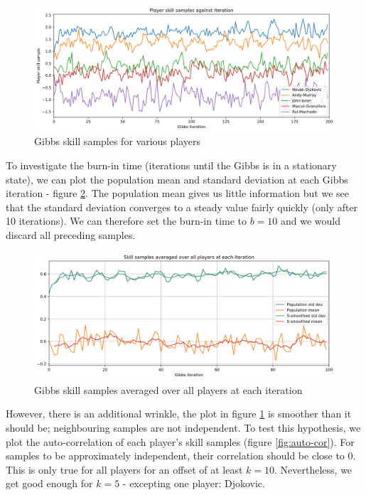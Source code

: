 \documentclass[]{article}
\begin{document}
\begin{figure}[!h]
	\centering
	\includegraphics[width=\linewidth]{skill-samples-long.png}
	\caption{Gibbs skill samples for various players}
	\label{fig:skill-samples-long}
\end{figure}

To investigate the burn-in time (iterations until the Gibbs is in a stationary state), we can plot the population mean and standard deviation at each Gibbs iteration - figure \ref{fig:burn-in}. The population mean gives us little information but we see that the standard deviation converges to a steady value fairly quickly (only after 10 iterations). We can therefore set the burn-in time to $b=10$ and we would discard all preceding samples. 

\begin{figure}[!h]
	\centering
	\includegraphics[width=\linewidth]{burn-in.png}
	\caption{Gibbs skill samples averaged over all players at each iteration}
	\label{fig:burn-in}
\end{figure}

However, there is an additional wrinkle, the plot in figure \ref{fig:skill-samples-long} is smoother than it should be; neighbouring samples are not independent. To test this hypothesis, we plot the auto-correlation of each player's skill samples (figure \ref{fig:auto-cor}). For samples to be approximately independent, their correlation should be close to 0. This is only true for all players for an offset of at least $k=10$. Nevertheless, we get good enough for $k=5$ - excepting one player: Djokovic.
\end{document}
